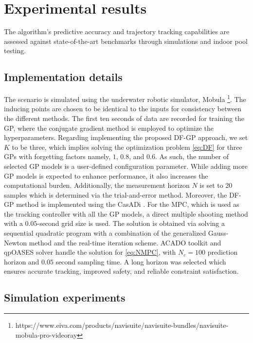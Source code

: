 \section{Experimental results}
\label{sec:expirments}
The algorithm's predictive accuracy and trajectory tracking capabilities are assessed against state-of-the-art benchmarks through simulations and indoor pool testing.

\subsection{Implementation details}



The scenario is simulated using the underwater robotic simulator, Mobula \footnote{https://www.eiva.com/products/navisuite/navisuite-bundles/navisuite-mobula-pro-videoray}. 
The inducing points are chosen to be identical to the inputs for consistency between the different methods. The first ten seconds of data are recorded for training the \ac{GP}, where the conjugate gradient method is employed to optimize the hyperparameters. Regarding implementing the proposed \ac{DF-GP} approach, we set $K$ to be three, which implies solving the optimization problem \eqref{eq:DF} for three \ac{GP}s with forgetting factors namely, $1$, $0.8$, and $0.6$.  
As such, the number of selected \ac{GP} models is a user-defined configuration parameter. While adding more \ac{GP} models is expected to enhance performance, it also increases the computational burden. Additionally, the measurement horizon $N$ is set to 20 samples which is determined via the trial-and-error method. Moreover, the \ac{DF-GP} method is implemented using the CasADi  \cite{casadi}. For the \ac{MPC}, which is used as the tracking controller with all the \ac{GP} models, a direct multiple shooting method with a $0.05$-second grid size is used. The solution is obtained via solving a sequential quadratic program with a combination of the generalized Gauss-Newton method and the real-time iteration scheme. ACADO toolkit \cite{acado} and qpOASES solver \cite{qpoases} handle the solution for \eqref{eq:NMPC}, with $N_c = 100$ prediction horizon and $0.05$ second sampling time. A long horizon was selected which ensures accurate tracking, improved safety, and reliable constraint satisfaction.








\subsection{Simulation experiments}


